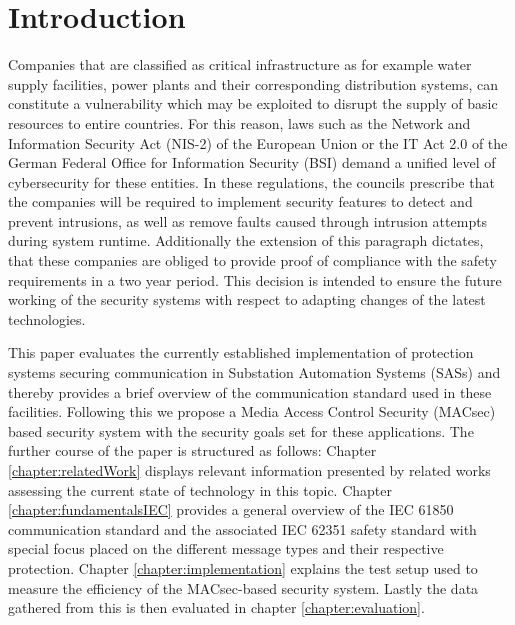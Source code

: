 \documentclass[conference]{IEEEtran}
\begin{document}
\section{Introduction}
\label{chapter:introduction}
\noindent Companies that are classified as critical infrastructure as for example water supply facilities, power plants and their corresponding 
distribution systems, can constitute a vulnerability which may be exploited to disrupt the supply of basic resources to entire countries. For this reason, 
laws such as the Network and Information Security Act (NIS-2) \cite{NIS-2:2022} of the European Union or the IT Act 2.0 \cite{IT-Gesetz_2:2021} of the 
German Federal Office for Information Security (BSI) demand a unified level of cybersecurity for these entities. In these regulations, the councils 
prescribe that the companies will be required to implement security features to detect and prevent intrusions, as well as remove faults caused through 
intrusion attempts during system runtime. \cite[§11 (1d)]{IT-Gesetz_2:2021} Additionally the extension of this paragraph dictates, that these companies 
are obliged to provide proof of compliance with the safety requirements in a two year period. \cite[§11 (1e)]{IT-Gesetz_2:2021} This decision is intended 
to ensure the future working of the security systems with respect to adapting changes of the latest technologies. 

\smallskip
This paper evaluates the currently established implementation of protection systems securing communication in Substation Automation Systems (SASs) and 
thereby provides a brief overview of the communication standard used in these facilities. Following this we propose a Media Access Control Security 
(MACsec) based security system with the security goals set for these applications. The further course of the paper is structured as follows: Chapter 
\ref{chapter:relatedWork} displays relevant information presented by related works assessing the current state of technology in this topic. Chapter 
\ref{chapter:fundamentalsIEC} provides a general overview of the IEC 61850 communication standard and the associated IEC 62351 safety standard with 
special focus placed on the different message types and their respective protection. Chapter \ref{chapter:implementation} explains the test setup used 
to measure the efficiency of the MACsec-based security system. Lastly the data gathered from this is then evaluated in chapter \ref{chapter:evaluation}. 

\end{document}
